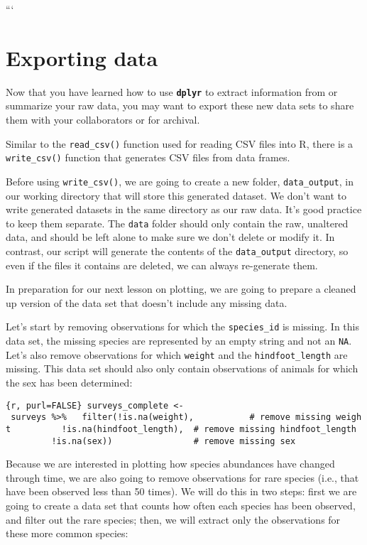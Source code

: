 \documentclass[]{article}
\begin{document}
```

\section{Exporting data}\label{exporting-data}

Now that you have learned how to use \textbf{\texttt{dplyr}} to extract
information from or summarize your raw data, you may want to export
these new data sets to share them with your collaborators or for
archival.

Similar to the \texttt{read\_csv()} function used for reading CSV files
into R, there is a \texttt{write\_csv()} function that generates CSV
files from data frames.

Before using \texttt{write\_csv()}, we are going to create a new folder,
\texttt{data\_output}, in our working directory that will store this
generated dataset. We don't want to write generated datasets in the same
directory as our raw data. It's good practice to keep them separate. The
\texttt{data} folder should only contain the raw, unaltered data, and
should be left alone to make sure we don't delete or modify it. In
contrast, our script will generate the contents of the
\texttt{data\_output} directory, so even if the files it contains are
deleted, we can always re-generate them.

In preparation for our next lesson on plotting, we are going to prepare
a cleaned up version of the data set that doesn't include any missing
data.

Let's start by removing observations for which the \texttt{species\_id}
is missing. In this data set, the missing species are represented by an
empty string and not an \texttt{NA}. Let's also remove observations for
which \texttt{weight} and the \texttt{hindfoot\_length} are missing.
This data set should also only contain observations of animals for which
the sex has been determined:

\texttt{\{r,\ purl=FALSE\}\ surveys\_complete\ \textless{}-\ surveys\ \%\textgreater{}\%\ \ \ filter(!is.na(weight),\ \ \ \ \ \ \ \ \ \ \ \#\ remove\ missing\ weight\ \ \ \ \ \ \ \ \ \ !is.na(hindfoot\_length),\ \ \#\ remove\ missing\ hindfoot\_length\ \ \ \ \ \ \ \ \ \ !is.na(sex))\ \ \ \ \ \ \ \ \ \ \ \ \ \ \ \ \#\ remove\ missing\ sex}

Because we are interested in plotting how species abundances have
changed through time, we are also going to remove observations for rare
species (i.e., that have been observed less than 50 times). We will do
this in two steps: first we are going to create a data set that counts
how often each species has been observed, and filter out the rare
species; then, we will extract only the observations for these more
common species:
\end{document}
